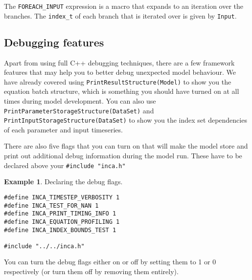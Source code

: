 \documentclass[11pt]{article}
\theoremstyle{definition}
\newtheorem{myexample}{Example}
\newenvironment{example}%
  {\begin{lrbox}{\examplebox}%
   \begin{minipage}{\dimexpr\linewidth-2\fboxsep}
   \begin{myexample}}%
  {\end{myexample}%
   \end{minipage}%
   \end{lrbox}%
   \begin{trivlist}
     \item[]\colorbox{silver}{\usebox\examplebox}
   \end{trivlist}}
\begin{document}
The {\tt FOREACH\_INPUT} expression is a macro that expands to an iteration over the branches. The {\tt index\_t} of each branch that is iterated over is given by {\tt *Input}.

\subsection{Debugging features}

Apart from using full C++ debugging techniques, there are a few framework features that may help you to better debug unexpected model behaviour. We have already covered using {\tt PrintResultStructure(Model)} to show you the equation batch structure, which is something you should have turned on at all times during model development. You can also use {\tt PrintParameterStorageStructure(DataSet)} and {\tt PrintInputStorageStructure(DataSet)} to show you the index set dependencies of each parameter and input timeseries.

There are also five flags that you can turn on that will make the model store and print out additional debug information during the model run. These have to be declared above your {\tt \#include "inca.h"}

\begin{example}
Declaring the debug flags.
\begin{lstlisting}[style=mycpp]
#define INCA_TIMESTEP_VERBOSITY 1
#define INCA_TEST_FOR_NAN 1
#define INCA_PRINT_TIMING_INFO 1
#define INCA_EQUATION_PROFILING 1
#define INCA_INDEX_BOUNDS_TEST 1

#include "../../inca.h"
\end{lstlisting}
\end{example}

You can turn the debug flags either on or off by setting them to 1 or 0 respectively (or turn them off by removing them entirely).
\end{document}
